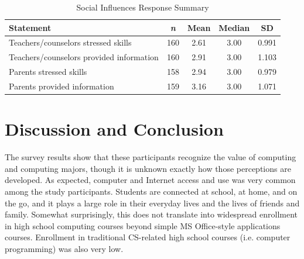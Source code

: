 \documentclass{article}
\begin{document}
\begin{table}[h]
\caption{Social Influences Response Summary} %
\label{table:social} %
\centering %
\begin{tabular}{l c c c c } %
\hline\hline %
Statement & \textit{n} & Mean & Median & SD \\  %
\hline %
Teachers/counselors stressed skills & 160 & 2.61 & 3.00 & 0.991 \\
Teachers/counselors provided information & 160 & 2.91 & 3.00 & 1.103 \\
Parents stressed skills & 158 & 2.94 & 3.00 & 0.979 \\
Parents provided information & 159 & 3.16 & 3.00 & 1.071 \\
\hline %
\end{tabular}
\end{table}

\section{Discussion and Conclusion}
The survey results show that these participants recognize the value of computing and computing majors, though it is unknown exactly how those perceptions are developed. As expected, computer and Internet access and use was very common among the study participants. Students are connected at school, at home, and on the go, and it plays a large role in their everyday lives and the lives of friends and family. Somewhat surprisingly, this does not translate into widespread enrollment in high school computing courses beyond simple MS Office-style applications courses. Enrollment in traditional CS-related high school courses (i.e. computer programming) was also very low.
\end{document}
